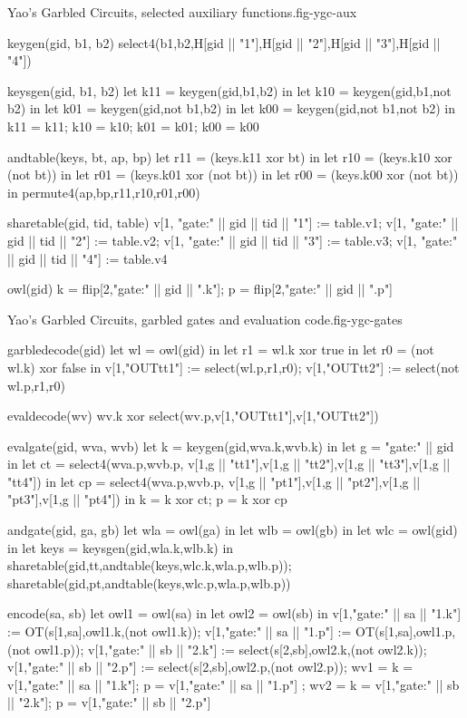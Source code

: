 \begin{fpfig}{Yao's Garbled Circuits, selected auxiliary functions.}{fig-ygc-aux}
{\footnotesize
\begin{verbatimtab}
  keygen(gid, b1, b2) { select4(b1,b2,H[gid || "1"],H[gid || "2"],H[gid || "3"],H[gid || "4"]) }
  
  keysgen(gid, b1, b2)
  {
    let k11 = keygen(gid,b1,b2) in
    let k10 = keygen(gid,b1,not b2) in
    let k01 = keygen(gid,not b1,b2) in
    let k00 = keygen(gid,not b1,not b2) in
    {k11 = k11; k10 = k10; k01 = k01; k00 = k00}
  }
  
  andtable(keys, bt, ap, bp)
  {
    let r11 = (keys.k11 xor bt) in 
    let r10 = (keys.k10 xor (not bt)) in
    let r01 = (keys.k01 xor (not bt)) in
    let r00 = (keys.k00 xor (not bt)) in
    permute4(ap,bp,r11,r10,r01,r00)
  }
  
  sharetable(gid, tid, table)
  {   
    v[1, "gate:" || gid || tid || "1"] := table.v1;
    v[1, "gate:" || gid || tid || "2"] := table.v2;
    v[1, "gate:" || gid || tid || "3"] := table.v3;
    v[1, "gate:" || gid || tid || "4"] := table.v4
  }

  owl(gid) {  { k = flip[2,"gate:" || gid || ".k"]; p = flip[2,"gate:" || gid || ".p"] }  }
\end{verbatimtab}
}
\end{fpfig}

\begin{fpfig}{Yao's Garbled Circuits, garbled gates and evaluation code.}{fig-ygc-gates}
{\footnotesize
\begin{verbatimtab}
  garbledecode(gid)    
  {
    let wl = owl(gid) in
    let r1 = wl.k xor true in
    let r0 = (not wl.k) xor false in
    v[1,"OUTtt1"] := select(wl.p,r1,r0);
    v[1,"OUTtt2"] := select(not wl.p,r1,r0)
  }
  
  evaldecode(wv) { wv.k xor select(wv.p,v[1,"OUTtt1"],v[1,"OUTtt2"]) }
  
  evalgate(gid, wva, wvb)  
  {
    let k = keygen(gid,wva.k,wvb.k) in
    let g = "gate:" || gid in
    let ct = select4(wva.p,wvb.p,
               v[1,g || "tt1"],v[1,g || "tt2"],v[1,g || "tt3"],v[1,g || "tt4"]) in
    let cp = select4(wva.p,wvb.p,
               v[1,g || "pt1"],v[1,g || "pt2"],v[1,g || "pt3"],v[1,g || "pt4"]) in
    { k = k xor ct; p = k xor cp }
  }
  
  andgate(gid, ga, gb) 
  {
    let wla = owl(ga) in
    let wlb = owl(gb) in
    let wlc = owl(gid) in
    let keys = keysgen(gid,wla.k,wlb.k) in
    sharetable(gid,tt,andtable(keys,wlc.k,wla.p,wlb.p));
    sharetable(gid,pt,andtable(keys,wlc.p,wla.p,wlb.p))
  }

  encode(sa, sb)
  {
    let owl1 = owl(sa) in
    let owl2 = owl(sb) in
    v[1,"gate:" || sa || "1.k"] := OT(s[1,sa],owl1.k,(not owl1.k));
    v[1,"gate:" || sa || "1.p"] := OT(s[1,sa],owl1.p,(not owl1.p));
    v[1,"gate:" || sb || "2.k"] := select(s[2,sb],owl2.k,(not owl2.k));
    v[1,"gate:" || sb || "2.p"] := select(s[2,sb],owl2.p,(not owl2.p));
    { wv1 = { k = v[1,"gate:" || sa || "1.k"]; p = v[1,"gate:" || sa || "1.p"] };
      wv2 = { k = v[1,"gate:" || sb || "2.k"]; p = v[1,"gate:" || sb || "2.p"] } }
  }
\end{verbatimtab}
}
\end{fpfig}

